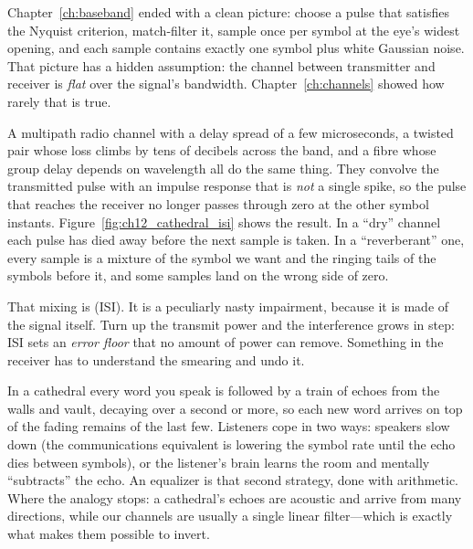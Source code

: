 Chapter~\ref{ch:baseband} ended with a clean picture: choose a pulse that satisfies the Nyquist
criterion, match-filter it, sample once per symbol at the eye's widest opening, and each sample
contains exactly one symbol plus white Gaussian noise. That picture has a hidden assumption:
the channel between transmitter and receiver is \emph{flat} over the signal's bandwidth.
Chapter~\ref{ch:channels} showed how rarely that is true.

A multipath radio channel with a delay spread of a few microseconds, a twisted pair whose loss
climbs by tens of decibels across the band, and a fibre whose group delay depends on wavelength
all do the same thing. They convolve the transmitted pulse with an impulse response that is
\emph{not} a single spike, so the pulse that reaches the receiver no longer passes through zero at
the other symbol instants. Figure~\ref{fig:ch12_cathedral_isi} shows the result. In a ``dry''
channel each pulse has died away before the next sample is taken. In a ``reverberant'' one, every
sample is a mixture of the symbol we want and the ringing tails of the symbols before it, and
some samples land on the wrong side of zero.


That mixing is  (ISI). It is a peculiarly nasty impairment, because
it is made of the signal itself. Turn up the transmit power and the interference grows in step:
ISI sets an \emph{error floor} that no amount of power can remove. Something in the receiver has
to understand the smearing and undo it.

\begin{analogy}
In a cathedral every word you speak is followed by a train of echoes from the walls and vault,
decaying over a second or more, so each new word arrives on top of the fading remains of the
last few. Listeners cope in two ways: speakers slow down (the communications equivalent is
lowering the symbol rate until the echo dies between symbols), or the listener's brain learns the
room and mentally ``subtracts'' the echo. An equalizer is that second strategy, done with
arithmetic. Where the analogy stops: a cathedral's echoes are acoustic and arrive from many
directions, while our channels are usually a single linear filter---which is exactly what makes
them possible to invert.
\end{analogy}

